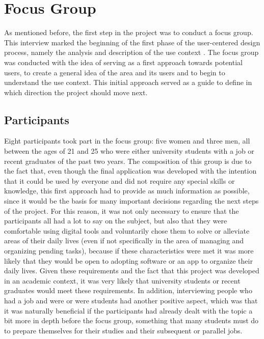 \section{Focus Group}
As mentioned before, the first step in the project was to conduct a focus group. This interview marked the beginning of the first phase of the user-centered design process, namely the analysis and description of the use context \cite{usabilityUXBook}. The focus group was conducted with the idea of serving as a first approach towards potential users, to create a general idea of the area and its users and to begin to understand the use context. This initial approach served as a guide to define in which direction the project should move next. \\

\subsection{Participants}
Eight participants took part in the focus group: five women and three men, all between the ages of 21 and 25 who were either university students with a job or recent graduates of the past two years. The composition of this group is due to the fact that, even though the final application was developed with the intention that it could be used by everyone and did not require any special skills or knowledge, this first approach had to provide as much information as possible, since it would be the basis for many important decisions regarding the next steps of the project. For this reason, it was not only necessary to ensure that the participants all had a lot to say on the subject, but also that they were comfortable using digital tools and voluntarily chose them to solve or alleviate areas of their daily lives (even if not specifically in the area of managing and organizing pending tasks), because if these characteristics were met it was more likely that they would be open to adopting software or an app to organize their daily lives. Given these requirements and the fact that this project was developed in an academic context, it was very likely that university students or recent graduates would meet these requirements. In addition, interviewing people who had a job and were or were students had another positive aspect, which was that it was naturally beneficial if the participants had already dealt with the topic a bit more in depth before the focus group, something that many students must do to prepare themselves for their studies and their subsequent or parallel jobs.

